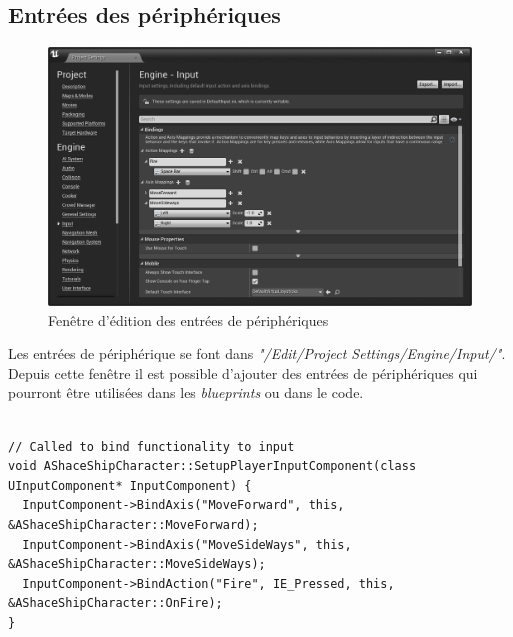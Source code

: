 \documentclass[11pt, a4paper, oneside]{article}
\begin{document}
\subsection{Entrées des périphériques}
\begin{center}
\begin{figure}[htp]
\includegraphics[scale=.58]{input}
\caption{Fenêtre d'édition des entrées de périphériques}
\label{fig:input}
\end{figure}
\end{center}

Les entrées de périphérique se font dans \emph{"/Edit/Project Settings/Engine/Input/"}. Depuis cette fenêtre il est possible d'ajouter des entrées de périphériques qui pourront être utilisées dans les \emph{blueprints} ou dans le code.

\lstset{language=C++}
\begin{lstlisting}[frame=single, caption={Exemple de code pour lié des entrées de périphériques à des méthodes de classe}, captionpos=b]  % Start your code-block

// Called to bind functionality to input
void AShaceShipCharacter::SetupPlayerInputComponent(class UInputComponent* InputComponent) {
  InputComponent->BindAxis("MoveForward", this, &AShaceShipCharacter::MoveForward);
  InputComponent->BindAxis("MoveSideWays", this, &AShaceShipCharacter::MoveSideWays);
  InputComponent->BindAction("Fire", IE_Pressed, this, &AShaceShipCharacter::OnFire);
}
\end{lstlisting}

\end{document}
